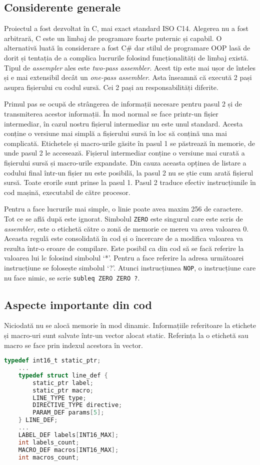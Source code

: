 \documentclass[../main.tex]{subfiles}
\begin{document}
\subsection{Considerente generale}
Proiectul a fost dezvoltat în C, mai exact standard ISO C14. Alegerea nu a fost arbitrară, C este un limbaj de
programare foarte puternic și capabil. O alternativă luată în considerare a fost C\# dar stilul de programare
OOP lasă de dorit și tentația de a complica lucrurile folosind funcționalități de limbaj există.
Tipul de \emph{assempler} ales este \emph{two-pass assembler}. Acest tip este mai ușor de înteles și e mai extensibil decât un
\emph{one-pass assembler}. Asta înseamnă că execută 2 pași asupra fișierului cu codul sursă. Cei 2 pași au
responsabilități diferite.

Primul pas se ocupă de strângerea de informații necesare pentru pasul 2 și de
transmiterea acestor informații. În mod normal se face printr-un fișier intermediar, în cazul nostru
fișierul intermediar nu este unul standard. Acesta conține o versiune mai simplă a fișierului sursă
în loc să conțină una mai complicată. Etichetele și macro-urile găsite în pasul 1 se păstrează în 
memorie, de unde pasul 2 le accesează. Fișierul intermediar conține o versiune mai curată a fișierului
sursă și macro-urile expandate. Din cauza aceasta opținea de listare a codului final într-un fișier
nu este posibilă, la pasul 2 nu se știe cum arată fișierul sursă. Toate erorile sunt prinse la pasul 1.
Pasul 2 traduce efectiv instrucțiunile în cod mașină, executabil de către procesor.

Pentru a face lucrurile mai simple, o linie poate avea maxim 256 de caractere.
Tot ce se află după este ignorat. Simbolul \texttt{ZERO} este singurul care este scris de \emph{assembler},
este o etichetă către o zonă de memorie ce mereu va avea valoarea 0. Aceasta regulă este consolidată în cod
și o încercare de a modifica valoarea va rezulta într-o eroare de compilare. Este posibil ca din cod să se
facă referire la valoarea lui \acrshort{lc} folosind simbolul `*'. Pentru a face referire la adresa
următoarei instrucțiune se folosește simbolul `?'. Atunci instrucțiunea \texttt{NOP}, o instrucțiune
care nu face nimic, se scrie \texttt{subleq ZERO ZERO ?}.

\subsection{Aspecte importante din cod}
Niciodată nu se alocă memorie în mod dinamic. Informațiile referitoare la etichete și macro-uri sunt salvate
într-un vector alocat static. Referința la o etichetă sau macro se face prin indexul acestora în vector.
\begin{lstlisting}[caption={Referință prin index în structura LINE\_DEF}, language={C}, label={lst:staticptr}]
    typedef int16_t static_ptr;
    ...
    typedef struct line_def {
	    static_ptr label;
	    static_ptr macro;
	    LINE_TYPE type;
	    DIRECTIVE_TYPE directive;
	    PARAM_DEF params[5];
    } LINE_DEF;
    ...
    LABEL_DEF labels[INT16_MAX];
    int labels_count;
    MACRO_DEF macros[INT16_MAX];
    int macros_count;
\end{lstlisting}
\end{document}
